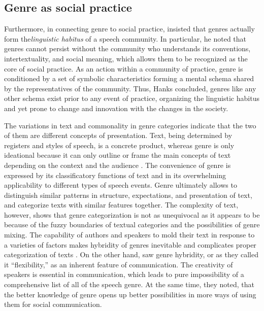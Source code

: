 \documentclass[12pt]{article}
\begin{document}
\subsection{Genre as social practice}
Furthermore, in connecting genre to social practice, \textcite{hanks1987} insisted that genres actually form the\textit{linguistic habitus} of a speech community. In particular, he noted that genres cannot persist without the community who understands its conventions, intertextuality, and social meaning, which allows them to be recognized as the core of social practice. As an action within a community of practice, genre is conditioned by a set of symbolic characteristics forming a mental schema shared by the representatives of the community. Thus, Hanks concluded, genres like any other schema exist prior to any event of practice, organizing the linguistic habitus and yet prone to change and innovation with the changes in the society.

The variations in text and commonality in genre categories indicate that the two of them are different concepts of presentation. Text, being determined by registers and styles of speech, is a concrete product, whereas genre is only ideational because it can only outline or frame the main concepts of text depending on the context and the audience \parencite{bax2011}. The convenience of genre is expressed by its classificatory functions of text and in its overwhelming applicability to different types of speech events. Genre ultimately allows to distinguish similar patterns in structure, expectations, and presentation of text, and categorize texts with similar features together. The complexity of text, however, shows that genre categorization is not as unequivocal as it appears to be because of the fuzzy boundaries of textual categories and the possibilities of genre mixing. The capability of authors and speakers to mold their text in response to a varieties of factors makes hybridity of genres inevitable and complicates proper categorization of texts \parencite{bax2011}. On the other hand, \textcite{bakhtin1986} saw genre hybridity, or as they called it ``flexibility,'' as an inherent feature of communication. The creativity of speakers is essential in communication, which leads to pure impossibility of a comprehensive list of all of the speech genre. At the same time, they noted, that the better knowledge of genre opens up better possibilities in more ways of using them for social communication.
\end{document}
